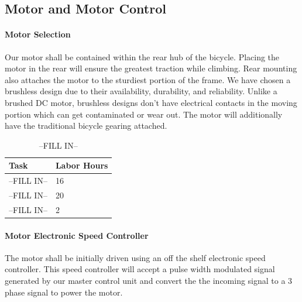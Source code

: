 \documentclass[12pt,article]{IEEEtran}
\begin{document}
    \subsection{\bfseries Motor and Motor Control}
        \paragraph{\bfseries Motor Selection}
            Our motor shall be contained within the rear hub of the bicycle. Placing the motor in the rear 
            will ensure the greatest traction while climbing. Rear mounting also attaches the motor to the 
            sturdiest portion of the frame. We have chosen a brushless design due to their availability, 
            durability, and reliability. Unlike a brushed DC motor, brushless designs don’t have electrical 
            contacts in the moving portion which can get contaminated or wear out. The motor will additionally 
            have the traditional bicycle gearing attached. 

       \begin{table}[H]        
            \renewcommand{\arraystretch}{1.3}
                \caption{--FILL IN--}
                
                \label{Estimated Time}
                
                \centering
                \begin{tabular}{p{5.5cm}|p{2cm}}
                \hline
                \bfseries   Task                        & \bfseries Labor Hours                         \\
                \hline\hline
                            --FILL IN--                 & 16                                            \\
                            --FILL IN--                 & 20                                            \\  
                            --FILL IN--                 & 2                                             \\   
                            \hline
                \end{tabular}
        \end{table}
        

    
        \paragraph{\bfseries Motor Electronic Speed Controller}
            The motor shall be initially driven using an off the shelf electronic speed controller. This speed
            controller will accept a pulse width modulated signal generated by our master control unit and convert
            the the incoming signal to a 3 phase signal to power the motor.
\end{document}
